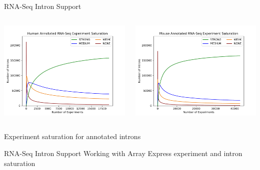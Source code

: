 \documentclass[10pt,
               hyperref={bookmarks=false,
                         bookmarksopen=false,
                         colorlinks=true,
                         linkcolor=blue,
                         urlcolor=blue},
               xcolor={svgnames,table}]{beamer}
\begin{document}
\begin{frame}{RNA-Seq Intron Support}
  \begin{columns}
    \begin{column}{0.5\textwidth}
      \includegraphics[scale=0.37]{images/hs_saturation_annot.pdf}
    \end{column}
    \begin{column}{0.5\textwidth}
      \includegraphics[scale=0.37]{images/mm_saturation_annot.pdf}
    \end{column}
  \end{columns}
  Experiment saturation for annotated introns
\end{frame}

\begin{frame}{RNA-Seq Intron Support}
  Working with Array Express
  \centering
  experiment and intron saturation
  
\end{frame}
\end{document}
